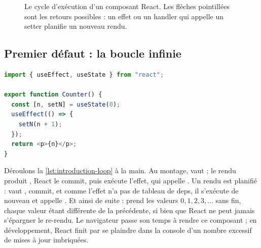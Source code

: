 \begin{figure}[htbp]\centering
{}
\caption{Le cycle d'exécution d'un composant React. Les flèches pointillées
sont les retours possibles : un effet ou un handler qui appelle un setter
planifie un nouveau rendu.}
\label{fig:introduction-cycle-react}
\end{figure}

\subsection{Premier défaut : la boucle infinie}

\begin{lstlisting}[language=TypeScript,caption={\code{Counter} : un effet sans deps qui écrit l'état qu'il lit (\file{/tmp/ch01/loop.tsx})},label={lst:introduction-loop}]
import { useEffect, useState } from "react";

export function Counter() {
  const [n, setN] = useState(0);
  useEffect(() => {
    setN(n + 1);
  });
  return <p>{n}</p>;
}
\end{lstlisting}

Déroulons la \cref{lst:introduction-loop} à la main. Au montage,  vaut
 ; le rendu produit , React le commit, puis exécute
l'effet, qui appelle . Un rendu est planifié :  vaut
, commit, et comme l'effet n'a pas de tableau de deps, il s'exécute de
nouveau et appelle . Et ainsi de suite :  prend les
valeurs $0, 1, 2, 3, \dots$ sans fin, chaque valeur étant différente de la
précédente, si bien que React ne peut jamais s'épargner le re-rendu. Le
navigateur passe son temps à rendre ce composant ; en développement, React
finit par se plaindre dans la console d'un nombre excessif de mises à jour
imbriquées.

